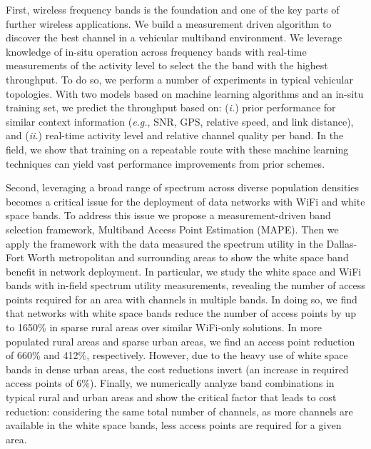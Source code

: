 First, wireless frequency bands is the foundation and one of the key parts of further 
wireless applications. We build a measurement driven algorithm to discover the best 
channel in a vehicular multiband environment. We leverage knowledge of in-situ operation 
across frequency bands with real-time measurements of the activity level to select the 
the band with the highest throughput. To do so, we perform a number of experiments in 
typical vehicular topologies. With two models based on machine learning algorithms and 
an in-situ training set, we predict the throughput based on: ({\it i.}) prior performance 
for similar context information ({\it e.g.}, SNR, GPS, relative speed, and link distance), 
and ({\it ii.}) real-time activity level and relative channel quality per band. In the 
field, we show that training on a repeatable route with these machine learning techniques 
can yield vast performance improvements from prior schemes. 

Second, leveraging a broad range of spectrum across diverse population densities 
becomes a critical issue for the deployment of data networks with WiFi and white 
space bands. To address this issue we propose a measurement-driven band selection 
framework, Multiband Access Point Estimation (MAPE). Then we apply the framework 
with the data measured the spectrum utility in the Dallas-Fort Worth metropolitan 
and surrounding areas to show the white space band benefit in network deployment. 
In particular, we study the white space and WiFi bands with in-field spectrum 
utility measurements, revealing the number of access points required for an area 
with channels in multiple bands. In doing so, we find that networks with white space 
bands reduce the number of access points by up to 1650\% in sparse rural areas over 
similar WiFi-only solutions. In more populated rural areas and sparse urban areas, 
we find an access point reduction of 660\% and 412\%, respectively.  However, due 
to the heavy use of white space bands in dense urban areas, the cost reductions 
invert (an increase in required access points of 6\%).  Finally, we numerically 
analyze band combinations in typical rural and urban areas and show the critical 
factor that leads to cost reduction: considering the same total number of channels, 
as more channels are available in the white space bands, less access points are 
required for a given area.

